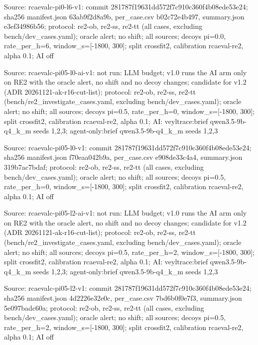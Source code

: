 \noindent Source: rcaevalc-pi0-l6-v1: commit 281787f19631dd572f7c910c360f4b08ede53e24; sha256 manifest.json 63ab9f2d8a9b, per\_case.csv b02c72e4b497, summary.json e3ef34986b56; protocol: re2-ob, re2-ss, re2-tt (all cases, excluding bench/\allowbreak{}dev\_cases.yaml); oracle alert; no shift; all sources; decoys pi=0.0, rate\_per\_h=6, window\_s=[-1800, 300]; split crossfit2, calibration rcaeval-re2, alpha 0.1; AI off\par
\noindent Source: rcaevalc-pi05-l0-ai-v1: not run: LLM budget; v1.0 runs the AI arm only on RE2 with the oracle alert, no shift and no decoy changes; candidate for v1.2 (ADR 20261121-ak-r16-cut-list); protocol: re2-ob, re2-ss, re2-tt (bench/\allowbreak{}re2\_investigate\_cases.yaml, excluding bench/\allowbreak{}dev\_cases.yaml); oracle alert; no shift; all sources; decoys pi=0.5, rate\_per\_h=0, window\_s=[-1800, 300]; split crossfit2, calibration rcaeval-re2, alpha 0.1; AI: veyltrace:brief qwen3.5-9b-q4\_k\_m seeds 1,2,3; agent-only:brief qwen3.5-9b-q4\_k\_m seeds 1,2,3\par
\noindent Source: rcaevalc-pi05-l0-v1: commit 281787f19631dd572f7c910c360f4b08ede53e24; sha256 manifest.json f70eaa042b9a, per\_case.csv e908de33c4a4, summary.json 319b7ac7bdaf; protocol: re2-ob, re2-ss, re2-tt (all cases, excluding bench/\allowbreak{}dev\_cases.yaml); oracle alert; no shift; all sources; decoys pi=0.5, rate\_per\_h=0, window\_s=[-1800, 300]; split crossfit2, calibration rcaeval-re2, alpha 0.1; AI off\par
\noindent Source: rcaevalc-pi05-l2-ai-v1: not run: LLM budget; v1.0 runs the AI arm only on RE2 with the oracle alert, no shift and no decoy changes; candidate for v1.2 (ADR 20261121-ak-r16-cut-list); protocol: re2-ob, re2-ss, re2-tt (bench/\allowbreak{}re2\_investigate\_cases.yaml, excluding bench/\allowbreak{}dev\_cases.yaml); oracle alert; no shift; all sources; decoys pi=0.5, rate\_per\_h=2, window\_s=[-1800, 300]; split crossfit2, calibration rcaeval-re2, alpha 0.1; AI: veyltrace:brief qwen3.5-9b-q4\_k\_m seeds 1,2,3; agent-only:brief qwen3.5-9b-q4\_k\_m seeds 1,2,3\par
\noindent Source: rcaevalc-pi05-l2-v1: commit 281787f19631dd572f7c910c360f4b08ede53e24; sha256 manifest.json 4d2226e32e0c, per\_case.csv 7bd6b0f0e7f3, summary.json 5e097badc60a; protocol: re2-ob, re2-ss, re2-tt (all cases, excluding bench/\allowbreak{}dev\_cases.yaml); oracle alert; no shift; all sources; decoys pi=0.5, rate\_per\_h=2, window\_s=[-1800, 300]; split crossfit2, calibration rcaeval-re2, alpha 0.1; AI off\par
